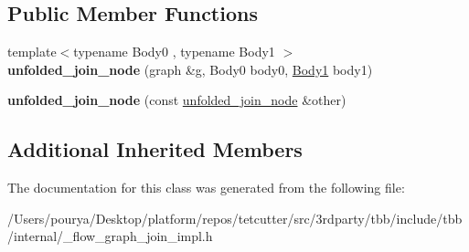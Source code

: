 \subsection*{Public Member Functions}
\begin{DoxyCompactItemize}
\item 
\hypertarget{classinternal_1_1unfolded__join__node_3_012_00_01tag__matching__port_00_01OutputTuple_00_01tag__matching_01_4_a7357024994de01d54c0d26ed5e762198}{}{\footnotesize template$<$typename Body0 , typename Body1 $>$ }\\{\bfseries unfolded\+\_\+join\+\_\+node} (graph \&g, Body0 body0, \hyperlink{structBody1}{Body1} body1)\label{classinternal_1_1unfolded__join__node_3_012_00_01tag__matching__port_00_01OutputTuple_00_01tag__matching_01_4_a7357024994de01d54c0d26ed5e762198}

\item 
\hypertarget{classinternal_1_1unfolded__join__node_3_012_00_01tag__matching__port_00_01OutputTuple_00_01tag__matching_01_4_a27ac2b753caf25d2f6308a4b1ec2931d}{}{\bfseries unfolded\+\_\+join\+\_\+node} (const \hyperlink{classinternal_1_1unfolded__join__node}{unfolded\+\_\+join\+\_\+node} \&other)\label{classinternal_1_1unfolded__join__node_3_012_00_01tag__matching__port_00_01OutputTuple_00_01tag__matching_01_4_a27ac2b753caf25d2f6308a4b1ec2931d}

\end{DoxyCompactItemize}
\subsection*{Additional Inherited Members}


The documentation for this class was generated from the following file\+:\begin{DoxyCompactItemize}
\item 
/\+Users/pourya/\+Desktop/platform/repos/tetcutter/src/3rdparty/tbb/include/tbb/internal/\+\_\+flow\+\_\+graph\+\_\+join\+\_\+impl.\+h\end{DoxyCompactItemize}
